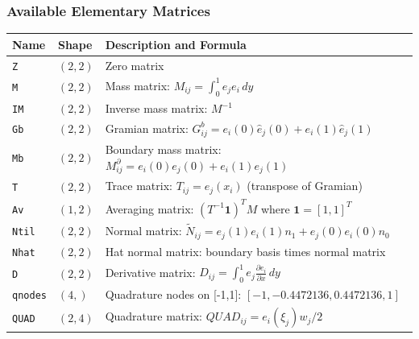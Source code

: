 \subsubsection{Available Elementary Matrices}

\begin{longtable}{|p{2cm}|p{2.5cm}|p{8.5cm}|}
\hline
\textbf{Name} & \textbf{Shape} & \textbf{Description and Formula} \\
\hline
\endhead

\texttt{Z} & $(2, 2)$ & Zero matrix \\
\hline

\texttt{M} & $(2, 2)$ & Mass matrix: $M_{ij} = \int_0^1 e_j e_i \, dy$ \\
\hline

\texttt{IM} & $(2, 2)$ & Inverse mass matrix: $M^{-1}$ \\
\hline

\texttt{Gb} & $(2, 2)$ & Gramian matrix: $G^b_{ij} = e_i(0)\hat{e}_j(0) + e_i(1)\hat{e}_j(1)$ \\
\hline

\texttt{Mb} & $(2, 2)$ & Boundary mass matrix: $M^{\partial}_{ij} =  e_i(0)  e_j(0) + e_i(1)  e_j(1)$ \\
\hline

\texttt{T} & $(2, 2)$ & Trace matrix: $T_{ij} = e_j(x_i)$ (transpose of Gramian) \\
\hline

\texttt{Av} & $(1, 2)$ & Averaging matrix: $(T^{-1} \mathbf{1})^T M$ where $\mathbf{1} = [1, 1]^T$ \\
\hline

\texttt{Ntil} & $(2, 2)$ & Normal matrix: $\tilde{N}_{ij} = e_j(1)e_i(1)n_1 + e_j(0)e_i(0)n_0$ \\
\hline

\texttt{Nhat} & $(2, 2)$ & Hat normal matrix: boundary basis times normal matrix \\
\hline

\texttt{D} & $(2, 2)$ & Derivative matrix: $D_{ij} = \int_0^1 e_j \frac{\partial e_i}{\partial x} \, dy$ \\
\hline

\texttt{qnodes} & $(4,)$ & Quadrature nodes on [-1,1]: $[-1, -0.4472136, 0.4472136, 1]$ \\
\hline

\texttt{QUAD} & $(2, 4)$ & Quadrature matrix: $QUAD_{ij} = e_i(\xi_j) w_j / 2$ \\
\hline

\end{longtable}

